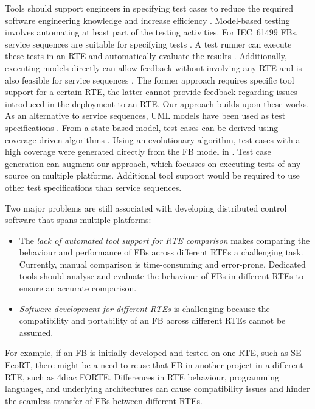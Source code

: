\begin{bibunit}
Tools should support engineers in specifying test cases to reduce the required software engineering knowledge and increase efficiency \cite{hametner2014}. Model-based testing involves automating at least part of the testing activities. For IEC~61499 FBs, service sequences are suitable for specifying tests \cite{hametner2014}. 
A test runner can execute these tests in an RTE and automatically evaluate the results \cite{hametner2014}. Additionally, executing models directly can allow feedback without involving any RTE and is also feasible for service sequences \cite{wiesmayr2021}. The former approach requires specific tool support for a certain RTE, the latter cannot provide feedback regarding issues introduced in the deployment to an RTE. Our approach builds upon these works. 
As an alternative to service sequences, UML models have been used as test specifications \cite{Hussain.2006}. From a state-based model, test cases can be derived using coverage-driven algorithms \cite{Hussain.2006}. Using an evolutionary algorithm, test cases with a high coverage were generated directly from the FB model in \cite{Buzhinsky.2015}. Test case generation can augment our approach, which focusses on executing tests of any source on multiple platforms. Additional tool support would be required to use other test specifications than service sequences.

Two major problems are still associated with developing distributed control software that spans multiple platforms: 
\begin{itemize}
    \item The \emph{lack of automated tool support for RTE comparison} makes comparing the behaviour and performance of FBs across different RTEs a challenging task. Currently, manual comparison is time-consuming and error-prone. Dedicated tools should analyse and evaluate the behaviour of FBs in different RTEs to ensure an accurate comparison.
    \item \emph{Software development for different RTEs} is challenging because the compatibility and portability of an FB across different RTEs cannot be assumed.
\end{itemize}
For example, if an FB is initially developed and tested on one RTE, such as SE EcoRT, there might be a need to reuse that FB in another project in a different RTE, such as 4diac FORTE. Differences in RTE behaviour, programming languages, and underlying architectures can cause compatibility issues and hinder the seamless transfer of FBs between different RTEs. 


\end{bibunit}
